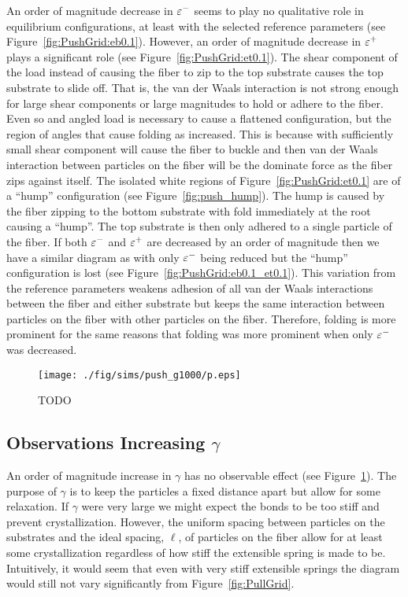 An order of magnitude decrease in $\varepsilon^-$ seems to play no qualitative role in equilibrium configurations, at least with the selected reference parameters (see Figure~\ref{fig:PushGrid:eb0.1}). However, an order of magnitude decrease in $\varepsilon^+$ plays a significant role (see Figure~\ref{fig:PushGrid:et0.1}). The shear component of the load instead of causing the fiber to zip to the top substrate causes the top substrate to slide off. That is, the van der Waals interaction is not strong enough for large shear components or large magnitudes to hold or adhere to the fiber. Even so and angled load is necessary to cause a flattened configuration, but the region of angles that cause folding as increased. This is because with sufficiently small shear component will cause the fiber to buckle and then van der Waals interaction between particles on the fiber will be the dominate force as the fiber zips against itself. The isolated white regions of Figure~\ref{fig:PushGrid:et0.1} are of a ``hump'' configuration (see Figure~\ref{fig:push_hump}). The hump is caused by the fiber zipping to the bottom substrate with fold immediately at the root causing a ``hump''. The top substrate is then only adhered to a single particle of the fiber. If both $\varepsilon^-$ and $\varepsilon^+$ are decreased by an order of magnitude then we have a similar diagram as with only $\varepsilon^-$ being reduced but the ``hump'' configuration is lost (see Figure~\ref{fig:PushGrid:eb0.1_et0.1}). This variation from the reference parameters weakens adhesion of all van der Waals interactions between the fiber and either substrate but keeps the same interaction between particles on the fiber with other particles on the fiber. Therefore, folding is more prominent for the same reasons that folding was more prominent when only $\varepsilon^-$ was decreased.
	
	\begin{figure}
		\begin{center}
			\texttt{[image: ./fig/sims/push\_g1000/p.eps]}
		\end{center}		
		\caption{ TODO
		\label{fig:PushGrid:g1000}}
	\end{figure}	

\subsection{Observations Increasing $\gamma$}

An order of magnitude increase in $\gamma$ has no observable effect (see Figure~\ref{fig:PushGrid:g1000}). The purpose of $\gamma$ is to keep the particles a fixed distance apart but allow for some relaxation. If $\gamma$ were very large we might expect the bonds to be too stiff and prevent crystallization. However, the uniform spacing between particles on the substrates and the ideal spacing, $\ell$, of particles on the fiber allow for at least some crystallization regardless of how stiff the extensible spring is made to be. Intuitively, it would seem that even with very stiff extensible springs the diagram would still not vary significantly from Figure~\ref{fig:PullGrid}.

